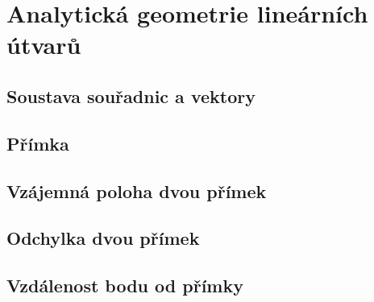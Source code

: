 
\newpage
    \section{Analytická geometrie lineárních útvarů}
        \subsection{Soustava souřadnic a vektory}
        \subsection{Přímka}
        \subsection{Vzájemná poloha dvou přímek}
        \subsection{Odchylka dvou přímek}
        \subsection{Vzdálenost bodu od přímky}










